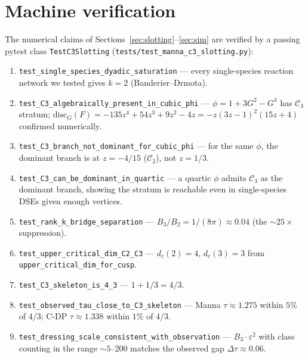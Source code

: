 \documentclass[10pt,a4paper,twocolumn]{article}
\theoremstyle{plain}
\theoremstyle{definition}
\newcommand{\eps}{\varepsilon}
\newcommand{\Cstr}[1]{\mathcal{C}_{#1}}
\begin{document}
\section{Machine verification}
\label{sec:tests}

The numerical claims of Sections~\ref{sec:slotting}--\ref{sec:sim}
are verified by a passing pytest class
\texttt{TestC3Slotting}
(\texttt{tests/test\_manna\_c3\_slotting.py}):

\begin{enumerate}[label=\arabic*.,leftmargin=1.8em,itemsep=1pt]
  \item \texttt{test\_single\_species\_dyadic\_saturation} ---
    every single-species reaction network we tested gives $k=2$
    (Banderier--Drmota).
  \item \texttt{test\_C3\_algebraically\_present\_in\_cubic\_phi} ---
    $\phi = 1 + 3G^2 - G^3$ has $\Cstr{3}$ stratum;
    $\mathrm{disc}_G(F) = -135 z^4 + 54 z^3 + 9 z^2 - 4 z =
    -z(3z-1)^2(15z+4)$ confirmed numerically.
  \item \texttt{test\_C3\_branch\_not\_dominant\_for\_cubic\_phi} ---
    for the same $\phi$, the dominant branch is at $z = -4/15$
    ($\Cstr{2}$), not $z = 1/3$.
  \item \texttt{test\_C3\_can\_be\_dominant\_in\_quartic} ---
    a quartic $\phi$ admits $\Cstr{3}$ as the dominant branch,
    showing the stratum is reachable even in single-species DSEs
    given enough vertices.
  \item \texttt{test\_rank\_k\_bridge\_separation} ---
    $B_3/B_2 = 1/(8\pi) \approx 0.04$ (the $\sim 25\times$
    suppression).
  \item \texttt{test\_upper\_critical\_dim\_C2\_C3} ---
    $d_c(2)=4$, $d_c(3)=3$ from \texttt{upper\_critical\_dim\_for\_cusp}.
  \item \texttt{test\_C3\_skeleton\_is\_4\_3} --- $1+1/3 = 4/3$.
  \item \texttt{test\_observed\_tau\_close\_to\_C3\_skeleton} ---
    Manna $\tau \approx 1.275$ within $5\%$ of $4/3$;
    C-DP $\tau \approx 1.338$ within $1\%$ of $4/3$.
  \item \texttt{test\_dressing\_scale\_consistent\_with\_observation} ---
    $B_3 \cdot \eps^2$ with class counting in the range $\sim 5$--$200$
    matches the observed gap $\Delta\tau \approx 0.06$.
\end{enumerate}
\end{document}
